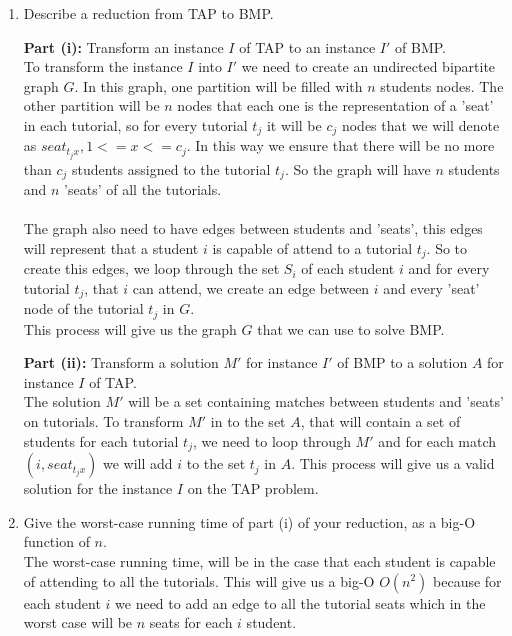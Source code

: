 \documentclass[11pt]{article}
\def\ans#1{{\color{ans}#1}}
\begin{document}
\begin{enumerate}
\item Describe a reduction from TAP to BMP.

\textbf{Part (i):} Transform an instance $I$ of TAP to an instance $I'$ of BMP.\\
\ans{
  To transform the instance $I$ into $I'$ we need to create an undirected bipartite graph $G$. In this 
  graph, one partition will be filled with $n$ students nodes. The other partition will be $n$ nodes 
  that each one is the representation of a 'seat' in each tutorial, so for every tutorial $t_j$ 
  it will be $c_j$ nodes that we will denote as $seat_{t_jx}, 1<=x<=c_j$. In this way we ensure that there will be no more than $c_j$ students 
  assigned to the tutorial $t_j$. So the graph will have $n$ students and $n$ 'seats' of all the 
  tutorials. \\ \\
  The graph also need to have edges between students and 'seats', this edges will represent that a 
  student $i$ is capable of attend to a tutorial $t_j$. So to create this edges, we loop through the 
  set $S_i$ of each student $i$ and for every tutorial $t_j$, that $i$ can attend, we create an edge 
  between $i$ and every 'seat' node of the tutorial $t_j$ in $G$. \\
  This process will give us the graph $G$ that we can use to solve BMP.
}

\textbf{Part (ii):} Transform a solution $M'$ for instance $I'$ of BMP to
a solution $A$ for instance $I$ of TAP. \\
\ans{
  The solution $M'$ will be a set containing matches between students and 'seats' on tutorials. To 
  transform $M'$ in to the set $A$, that will contain a set of students for each tutorial $t_j$, we 
  need to loop through $M'$ and for each match $(i,seat_{t_jx})$ we will add $i$ to the set $t_j$ in 
  $A$. This process will give us a valid solution for the instance $I$ on the TAP problem.
}

\item Give the worst-case running time of part (i)
of your reduction, as a big-O function of $n$. \\
\ans{
  The worst-case running time, will be in the case that each student is capable of attending to all 
  the tutorials. This will give us a big-O $O(n^2)$ because for each student $i$ we need to add an edge 
  to all the tutorial seats which in the worst case will be $n$ seats for each $i$ student. 
}


\end{enumerate}
\end{document}
